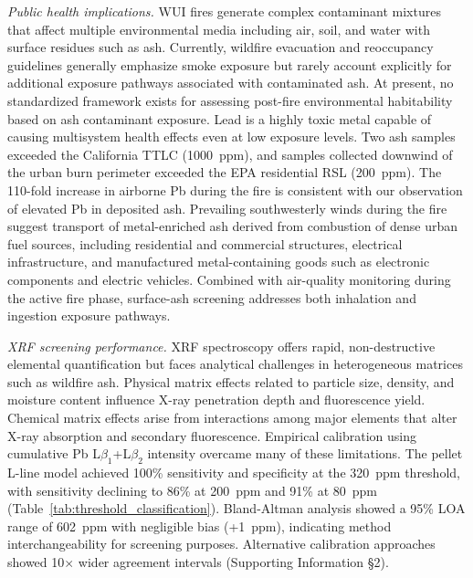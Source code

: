 \documentclass[
  journal=esthag,        %
  manuscript=article,    %
  layout=onecolumn       %
]{achemso}
\begin{document}
\textit{Public health implications.}
WUI fires generate complex contaminant mixtures that affect multiple environmental media including air, soil, and water with surface residues such as ash. Currently, wildfire evacuation and reoccupancy guidelines generally emphasize smoke exposure but rarely account explicitly for additional exposure pathways associated with contaminated ash. At present, no standardized framework exists for assessing post-fire environmental habitability based on ash contaminant exposure. Lead is a highly toxic metal capable of causing multisystem health effects even at low exposure levels.\cite{tong2000leadexposure,jusko2008bloodlead,levin2008leadexposures} Two ash samples exceeded the California TTLC (1000~ppm), and samples collected downwind of the urban burn perimeter exceeded the EPA residential RSL (200~ppm). The 110-fold increase in airborne Pb during the fire\cite{baliaka2025mmwr} is consistent with our observation of elevated Pb in deposited ash. Prevailing southwesterly winds during the fire suggest transport of metal-enriched ash derived from combustion of dense urban fuel sources, including residential and commercial structures, electrical infrastructure, and manufactured metal-containing goods such as electronic components and electric vehicles. Combined with air-quality monitoring during the active fire phase, surface-ash screening addresses both inhalation and ingestion exposure pathways.

\textit{XRF screening performance.}
XRF spectroscopy offers rapid, non-destructive elemental quantification but faces analytical challenges in heterogeneous matrices such as wildfire ash. Physical matrix effects related to particle size, density, and moisture content influence X-ray penetration depth and fluorescence yield. Chemical matrix effects arise from interactions among major elements that alter X-ray absorption and secondary fluorescence. Empirical calibration using cumulative Pb L$\beta_1$+L$\beta_2$ intensity overcame many of these limitations. The pellet L-line model achieved 100\% sensitivity and specificity at the 320~ppm threshold, with sensitivity declining to 86\% at 200~ppm and 91\% at 80~ppm (Table~\ref{tab:threshold_classification}). Bland-Altman analysis showed a 95\% LOA range of 602~ppm with negligible bias (+1~ppm), indicating method interchangeability for screening purposes. Alternative calibration approaches showed 10$\times$ wider agreement intervals (Supporting Information \S 2).
\end{document}
